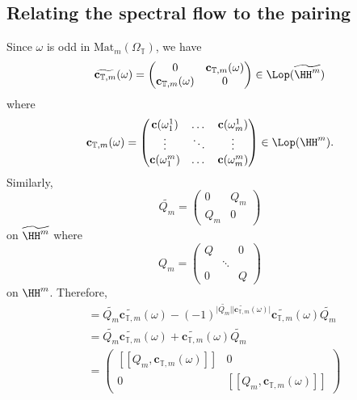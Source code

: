 \documentclass[a4paper, english, 12pt, bibliography=totocnumbered,
index=totoc]{scrartcl}
\begin{document}
\subsection{Relating the spectral flow to the pairing}\label{Section:
	spectral flow pairing 2}
Since $\omega$ is odd in $\mathrm{Mat}_m(\Omega_{\mathbb{T}})$, we have
\begin{equation*}
	\widetilde{\mathbf{c}_{\mathbb{T}, m}}(\omega) =
	\begin{pmatrix}
		0 & \mathbf{c}_{\mathbb{T}, m}(\omega) \\
		\mathbf{c}_{\mathbb{T}, m}(\omega) & 0
	\end{pmatrix} \in \Lop(\widetilde{\HH^m})
\end{equation*}
where
\begin{equation*}
	\mathbf{c}_{\mathbb{T}, m}(\omega) =
	\begin{pmatrix}
		\mathbf{c}(\omega_{1}^1) &  \dots & \mathbf{c}(\omega_{m}^1) \\
		\vdots & \ddots & \vdots \\
		\mathbf{c}(\omega_{1}^m)  & \dots & \mathbf{c}(\omega_{m}^m)
	\end{pmatrix} \in \Lop(\HH^m).
\end{equation*}
Similarly,
\begin{equation*}
	\widetilde{Q_m} =
	\begin{pmatrix}
		0 & Q_m \\
		Q_m & 0
	\end{pmatrix}
\end{equation*}
on $\widetilde{\HH^m}$ where
\begin{equation*}
	Q_m =
	\begin{pmatrix}
		Q & & 0 \\
		& \ddots & \\
		0  & & Q
	\end{pmatrix}
\end{equation*}
on $\HH^m$.
Therefore,
\begin{align*}
	[\widetilde{Q_m}, \widetilde{\mathbf{c}_{\mathbb{T}, m}}(\omega)] & =
	\widetilde{Q_m}\widetilde{\mathbf{c}_{\mathbb{T}, m}}(\omega) -
	(-1)^{\lvert
		\widetilde{Q_m} \rvert \lvert \widetilde{\mathbf{c}_{\mathbb{T},
				m}}(\omega) \rvert}\widetilde{\mathbf{c}_{\mathbb{T},
			m}}(\omega)
	\widetilde{Q_m} \\
	&=
	\widetilde{Q_m}\widetilde{\mathbf{c}_{\mathbb{T}, m}}(\omega) +
	\widetilde{\mathbf{c}_{\mathbb{T}, m}}(\omega) \widetilde{Q_m} \\
	& =
	\begin{pmatrix}
		[[Q_m, \mathbf{c}_{\mathbb{T}, m}(\omega)]] & 0 \\
		0 & [[Q_m, \mathbf{c}_{\mathbb{T}, m}(\omega)]]
	\end{pmatrix}
\end{align*}
\end{document}
